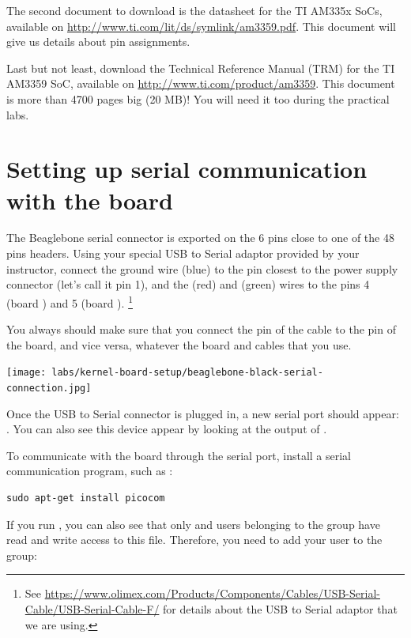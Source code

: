 The second document to download is the datasheet for the
TI AM335x SoCs, available on
\url{http://www.ti.com/lit/ds/symlink/am3359.pdf}. This document will
give us details about pin assignments.

Last but not least, download the Technical Reference Manual (TRM) for
the TI AM3359 SoC, available on \url{http://www.ti.com/product/am3359}.
This document is more than 4700 pages big (20 MB)! You will need it
too during the practical labs.

\section{Setting up serial communication with the board}

The Beaglebone serial connector is exported on the 6 pins close to one
of the 48 pins headers. Using your special USB to Serial adaptor provided
by your instructor, connect the ground wire (blue) to the pin closest
to the power supply connector (let's call it pin 1), and the  (red)
and  (green) wires to the pins 4 (board ) and
5 (board ). \footnote{See
\url{https://www.olimex.com/Products/Components/Cables/USB-Serial-Cable/USB-Serial-Cable-F/}
for details about the USB to Serial adaptor that we are using.}

You always should make sure that you connect the  pin of the cable
to the  pin of the board, and vice versa, whatever the board and
cables that you use.

\begin{center}
\texttt{[image: labs/kernel-board-setup/beaglebone-black-serial-connection.jpg]}
\end{center}

Once the USB to Serial connector is plugged in, a new serial port
should appear: .  You can also see this device
appear by looking at the output of .

To communicate with the board through the serial port, install a
serial communication program, such as :

\begin{verbatim}
sudo apt-get install picocom
\end{verbatim}

If you run , you can also see that only
 and users belonging to the  group have
read and write access to this file. Therefore, you need to add your user
to the  group:

